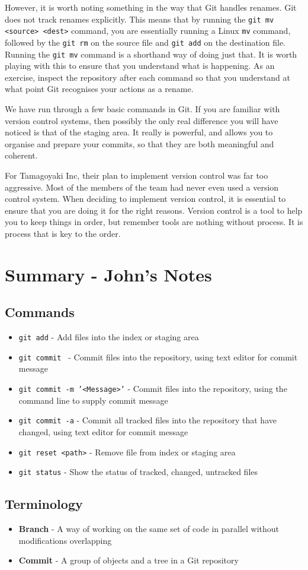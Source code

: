 However, it is worth noting something in the way that Git handles renames.
Git does not track renames explicitly.
This means that by running the \texttt{git mv <source> <dest>} command, you are essentially running a Linux \texttt{mv} command, followed by the \texttt{git rm} on the source file and \texttt{git add} on the destination file.
Running the \texttt{git mv} command is a shorthand way of doing just that.
It is worth playing with this to ensure that you understand what is happening.
As an exercise, inspect the repository after each command so that you understand at what point Git recognises your actions as a rename.

We have run through a few basic commands in Git.
If you are familiar with version control systems, then possibly the only real difference you will have noticed is that of the staging area.
It really is powerful, and allows you to organise and prepare your commits, so that they are both meaningful and coherent.

For Tamagoyaki Inc, their plan to implement version control was far too aggressive.
Most of the members of the team had never even used a version control system.
When deciding to implement version control, it is essential to ensure that you are doing it for the right reasons.
Version control is a tool to help you to keep things in order, but remember tools are nothing without process.
It is process that is key to the order.


\clearpage
\section{Summary - John's Notes}
\subsection{Commands}
\begin{itemize}
\item\texttt{git add} - Add files into the index or staging area

\item\texttt{git commit } - Commit files into the repository, using text editor for commit message

\item\texttt{git commit -m '<Message>'} - Commit files into the repository, using the command line to supply commit message

\item\texttt{git commit -a} - Commit all tracked files into the repository that have changed, using text editor for commit message

\item\texttt{git reset <path>} - Remove file from index or staging area

\item\texttt{git status} - Show the status of tracked, changed, untracked files
\end{itemize}

\subsection{Terminology}
\begin{itemize}
\item\textbf{Branch} - A way of working on the same set of code in parallel without modifications overlapping

\item\textbf{Commit} - A group of objects and a tree in a Git repository
\end{itemize}
